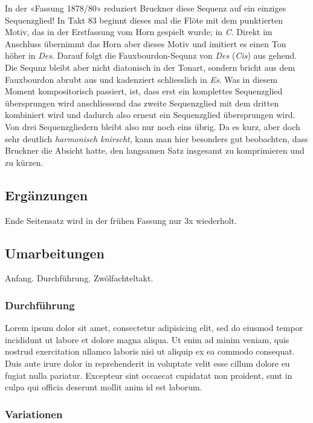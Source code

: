 In der «Fassung 1878/80» reduziert Bruckner diese Sequenz auf ein einziges Sequenzglied! In Takt 83 beginnt dieses mal die Flöte mit dem punktierten Motiv, das in der Erstfassung vom Horn gespielt wurde; in \emph{C}.
Direkt im Anschluss übernimmt das Horn aber dieses Motiv und imitiert es einen Ton höher in \emph{Des}.
Darauf folgt die Fauxbourdon-Sequnz von \emph{Des} (\emph{Cis}) aus gehend.
Die Sequnz bleibt aber nicht diatonisch in der Tonart, sondern bricht aus dem Fauxbourdon abrubt aus und kadenziert schliesslich in \emph{Es}.
Was in diesem Moment kompositorisch passiert, ist, dass erst ein komplettes Sequenzglied übersprungen wird anschliessend das zweite Sequenzglied mit dem dritten kombiniert wird und dadurch also erneut ein Sequenzglied übersprungen wird.
Von drei Sequenzgliedern bleibt also nur noch eins übrig.
Da es kurz, aber doch sehr deutlich \emph{harmonisch knirscht}, kann man hier besonders gut beobachten, dass Bruckner die Absicht hatte, den langsamen Satz insgesamt zu komprimieren und zu kürzen.


\subsection{Ergänzungen}

Ende Seitensatz wird in der frühen Fassung nur 3x wiederholt.

\subsection{Umarbeitungen}

Anfang.
Durchführung.
Zwölfachteltakt.

\subsubsection{Durchführung}

Lorem ipsum dolor sit amet, consectetur adipisicing elit, sed do eiusmod tempor incididunt ut labore et dolore magna aliqua. Ut enim ad minim veniam, quis nostrud exercitation ullamco laboris nisi ut aliquip ex ea commodo consequat. Duis aute irure dolor in reprehenderit in voluptate velit esse cillum dolore eu fugiat nulla pariatur. Excepteur sint occaecat cupidatat non proident, sunt in culpa qui officia deserunt mollit anim id est laborum.

\subsubsection{Variationen}

